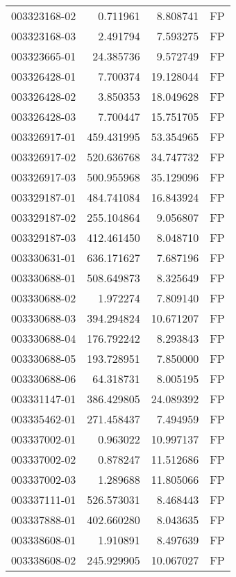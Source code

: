 \begin{tabular}{lrrl}
003323168-02 &    0.711961 &       8.808741 &   FP \\
003323168-03 &    2.491794 &       7.593275 &   FP \\
003323665-01 &   24.385736 &       9.572749 &   FP \\
003326428-01 &    7.700374 &      19.128044 &   FP \\
003326428-02 &    3.850353 &      18.049628 &   FP \\
003326428-03 &    7.700447 &      15.751705 &   FP \\
003326917-01 &  459.431995 &      53.354965 &   FP \\
003326917-02 &  520.636768 &      34.747732 &   FP \\
003326917-03 &  500.955968 &      35.129096 &   FP \\
003329187-01 &  484.741084 &      16.843924 &   FP \\
003329187-02 &  255.104864 &       9.056807 &   FP \\
003329187-03 &  412.461450 &       8.048710 &   FP \\
003330631-01 &  636.171627 &       7.687196 &   FP \\
003330688-01 &  508.649873 &       8.325649 &   FP \\
003330688-02 &    1.972274 &       7.809140 &   FP \\
003330688-03 &  394.294824 &      10.671207 &   FP \\
003330688-04 &  176.792242 &       8.293843 &   FP \\
003330688-05 &  193.728951 &       7.850000 &   FP \\
003330688-06 &   64.318731 &       8.005195 &   FP \\
003331147-01 &  386.429805 &      24.089392 &   FP \\
003335462-01 &  271.458437 &       7.494959 &   FP \\
003337002-01 &    0.963022 &      10.997137 &   FP \\
003337002-02 &    0.878247 &      11.512686 &   FP \\
003337002-03 &    1.289688 &      11.805066 &   FP \\
003337111-01 &  526.573031 &       8.468443 &   FP \\
003337888-01 &  402.660280 &       8.043635 &   FP \\
003338608-01 &    1.910891 &       8.497639 &   FP \\
003338608-02 &  245.929905 &      10.067027 &   FP \\

\end{tabular}
